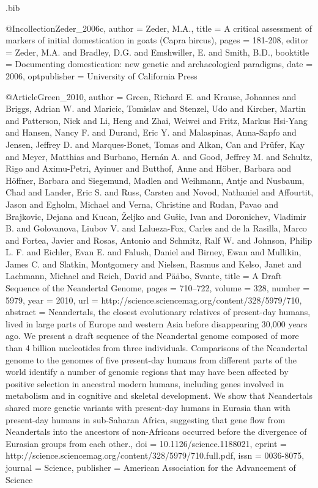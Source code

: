 \begin{filecontents}{\identifier.bib}

@Incollection{Zeder_2006c,
  author =       {Zeder, M.A.},
  title =        {A critical assessment of markers of initial domestication in goats (Capra hircus)},
  pages =        {181-208},
  editor =       {Zeder, M.A. and Bradley, D.G. and Emshwiller, E. and Smith, B.D.},
  booktitle =    {Documenting domestication: new genetic and archaeological paradigms},
  date =         {2006},
  optpublisher = {University of California Press}
}

@Article{Green_2010,
  author =    {Green, Richard E. and Krause, Johannes and Briggs, Adrian W. and Maricic, Tomislav and Stenzel, Udo and Kircher, Martin and Patterson, Nick and Li, Heng and Zhai, Weiwei and Fritz, Markus Hsi-Yang and Hansen, Nancy F. and Durand, Eric Y. and Malaspinas, Anna-Sapfo and Jensen, Jeffrey D. and Marques-Bonet, Tomas and Alkan, Can and Pr{\"u}fer, Kay and Meyer, Matthias and Burbano, Hern{\'a}n A. and Good, Jeffrey M. and Schultz, Rigo and Aximu-Petri, Ayinuer and Butthof, Anne and H{\"o}ber, Barbara and H{\"o}ffner, Barbara and Siegemund, Madlen and Weihmann, Antje and Nusbaum, Chad and Lander, Eric S. and Russ, Carsten and Novod, Nathaniel and Affourtit, Jason and Egholm, Michael and Verna, Christine and Rudan, Pavao and Brajkovic, Dejana and Kucan, {\v Z}eljko and Gu{\v s}ic, Ivan and Doronichev, Vladimir B. and Golovanova, Liubov V. and Lalueza-Fox, Carles and de la Rasilla, Marco and Fortea, Javier and Rosas, Antonio and Schmitz, Ralf W. and Johnson, Philip L. F. and Eichler, Evan E. and Falush, Daniel and Birney, Ewan and Mullikin, James C. and Slatkin, Montgomery and Nielsen, Rasmus and Kelso, Janet and Lachmann, Michael and Reich, David and P{\"a}{\"a}bo, Svante},
  title =     {A Draft Sequence of the Neandertal Genome},
  pages =     {710--722},
  volume =    {328},
  number =    {5979},
  year =      {2010},
  url =       {http://science.sciencemag.org/content/328/5979/710},
  abstract =  {Neandertals, the closest evolutionary relatives of present-day humans, lived in large parts of Europe and western Asia before disappearing 30,000 years ago. We present a draft sequence of the Neandertal genome composed of more than 4 billion nucleotides from three individuals. Comparisons of the Neandertal genome to the genomes of five present-day humans from different parts of the world identify a number of genomic regions that may have been affected by positive selection in ancestral modern humans, including genes involved in metabolism and in cognitive and skeletal development. We show that Neandertals shared more genetic variants with present-day humans in Eurasia than with present-day humans in sub-Saharan Africa, suggesting that gene flow from Neandertals into the ancestors of non-Africans occurred before the divergence of Eurasian groups from each other.},
  doi =       {10.1126/science.1188021},
  eprint =    {http://science.sciencemag.org/content/328/5979/710.full.pdf},
  issn =      {0036-8075},
  journal =   {Science},
  publisher = {American Association for the Advancement of Science}
}


\end{filecontents}
